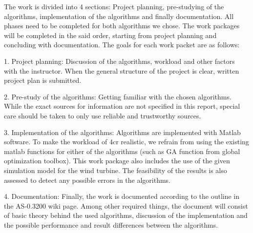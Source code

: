 \documentclass[twoside]{article}
\begin{document}
\begin{multicols}{2}
The work is divided into 4 sections: Project planning, pre-studying of the algorithms, implementation of the algorithms and finally documentation. All phases need to be completed for both algorithms we chose. The work packages will be completed in the said order, starting from project planning and concluding with documentation. The goals for each work packet are as follows:

1. Project planning:
Discussion of the algorithms, workload and other factors with the instructor. When the general structure of the project is clear, written project plan is submitted.

2. Pre-study of the algorithms:
Getting familiar with the chosen algorithms. While the exact sources for information are not specified in this report, special care should be taken to only use reliable and trustworthy sources.

3. Implementation of the algorithms:
Algorithms are implemented with Matlab software. To make the workload of 4cr realistic, we refrain from using the existing matlab functions for either of the algorithms (such as GA function from global optimization toolbox). This work package also includes the use of the given simulation model for the wind turbine. The feasibility of the results is also assessed to detect any possible errors in the algorithms.

4. Documentation:
Finally, the work is documented according to the outline in the AS-0.3200 wiki page. Among other required things, the document will consist of basic theory behind the used algorithms, discussion of the implementation and the possible performance and result differences between the algorithms.




\end{multicols}
\end{document}
